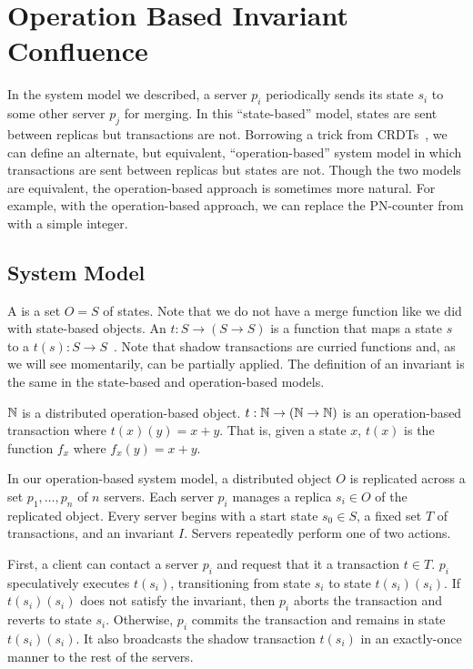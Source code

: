 \section{Operation Based Invariant Confluence}
In the system model we described, a server $p_i$ periodically sends its state
$s_i$ to some other server $p_j$ for merging. In this ``state-based'' model,
states are sent between replicas but transactions are not. Borrowing a trick
from CRDTs~\cite{shapiro2011conflict, shapiro2011comprehensive}, we can define
an alternate, but equivalent, ``operation-based'' system model in which
transactions are sent between replicas but states are not. Though the two
models are equivalent, the operation-based approach is sometimes more natural.
For example, with the operation-based approach, we can replace the PN-counter
from  with a simple integer.

\subsection{System Model}
A  is a set $O = S$ of states. Note
that we do not have a merge function like we did with state-based objects.
%
An  $t: S \to (S \to S)$ is a function
that maps a state $s$ to a  $t(s): S \to
S$~\cite{li2014automating}. Note that shadow transactions are curried functions
and, as we will see momentarily, can be partially applied.
%
The definition of an invariant is the same in the state-based and
operation-based models.

\begin{example}
  $\mathbb{N}$ is a distributed operation-based object. $t: \mathbb{N} \to (\mathbb{N} \to
  \mathbb{N})$ is an operation-based transaction where $t(x)(y) = x + y$. That is,
  given a state $x$, $t(x)$ is the function $f_x$ where $f_x(y) = x + y$.
\end{example}

In our operation-based system model, a distributed object $O$ is replicated
across a set $p_1, \ldots, p_n$ of $n$ servers. Each server $p_i$ manages a
replica $s_i \in O$ of the replicated object. Every server begins with a start
state $s_0 \in S$, a fixed set $T$ of transactions, and an invariant $I$.
Servers repeatedly perform one of two actions.

First, a client can contact a server $p_i$ and request that it
 a transaction $t \in T$. $p_i$ speculatively executes
$t(s_i)$, transitioning from state $s_i$ to state $t(s_i)(s_i)$. If
$t(s_i)(s_i)$ does not satisfy the invariant, then $p_i$ aborts the transaction
and reverts to state $s_i$.  Otherwise, $p_i$ commits the transaction and
remains in state $t(s_i)(s_i)$. It also broadcasts the shadow transaction
$t(s_i)$ in an exactly-once manner to the rest of the servers.

